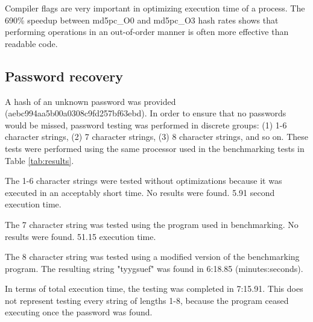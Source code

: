 		Compiler flags are very important in optimizing execution time of a process. The 690\% speedup between md5pc\_O0 and md5pc\_O3 hash rates shows that performing operations in an out-of-order manner is often more effective than readable code. 

	\subsection{Password recovery}
		A hash of an unknown password was provided (aebc994aa5b00a0308c9fd257bf63ebd). In order to ensure that no passwords would be missed, password testing was performed in discrete groups: (1) 1-6 character strings, (2) 7 character strings, (3) 8 character strings, and so on. These tests were performed using the same processor used in the benchmarking tests in Table \ref{tab:results}. 

		The 1-6 character strings were tested without optimizations because it was executed in an acceptably short time. No results were found. 5.91 second execution time. 

		The 7 character string was tested using the program used in benchmarking. No results were found. 51.15 execution time.

		The 8 character string was tested using a modified version of the benchmarking program. The resulting string "tyygsuef" was found in 6:18.85 (minutes:seconds). 

		In terms of total execution time, the testing was completed in 7:15.91. This does not represent testing every string of lengths 1-8, because the program ceased executing once the password was found. 